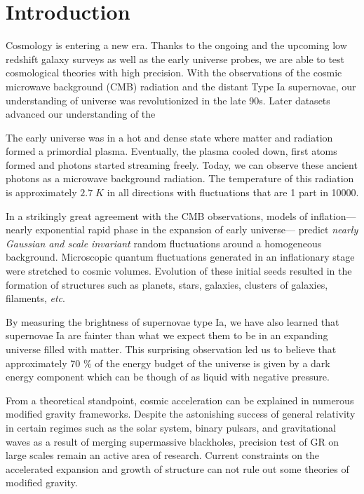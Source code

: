 \chapter*{Introduction}

Cosmology is entering a new era. Thanks to the ongoing and 
the upcoming low redshift galaxy surveys as well as the early universe probes, 
we are able to test cosmological theories with high precision.
With the observations of the cosmic microwave background (CMB) radiation 
and the distant Type Ia supernovae, our understanding of universe was 
revolutionized in the late 90s. Later datasets advanced our understanding 
of the 

The early universe was in a hot and dense state where 
matter and radiation formed a primordial plasma. Eventually, the 
plasma cooled down, first atoms formed and photons started streaming freely.  
Today, we can observe these ancient photons as a microwave background radiation. 
The temperature of this radiation is approximately $2.7 \; K$ in all directions with 
fluctuations that are 1 part in 10000.

In a strikingly great agreement with the CMB observations, models of inflation---nearly 
exponential rapid phase in the expansion of early universe--- 
predict \emph{nearly Gaussian and scale invariant} random fluctuations around a homogeneous 
background. Microscopic quantum fluctuations generated in an inflationary 
stage were stretched to cosmic volumes. Evolution of these initial seeds 
resulted in the formation of structures such as planets, stars, galaxies, 
clusters of galaxies, filaments, \emph{etc}.

By measuring the brightness of supernovae type Ia, we have also learned 
that supernovae Ia are fainter than what we expect them to be in an 
expanding universe filled with matter. This surprising observation led us to 
believe that approximately 70 $\%$ of the energy budget of the universe is 
given by a dark energy component which can be though of as liquid with 
negative pressure.

From a theoretical standpoint, cosmic acceleration 
can be explained in numerous modified gravity frameworks. 
Despite the astonishing success of general relativity in 
certain regimes such as the solar system, binary pulsars, 
and gravitational waves as a result of merging supermassive blackholes, 
precision test of GR on large scales remain an active area of research. 
Current constraints on the accelerated expansion and growth of structure 
can not rule out some theories of modified gravity.

